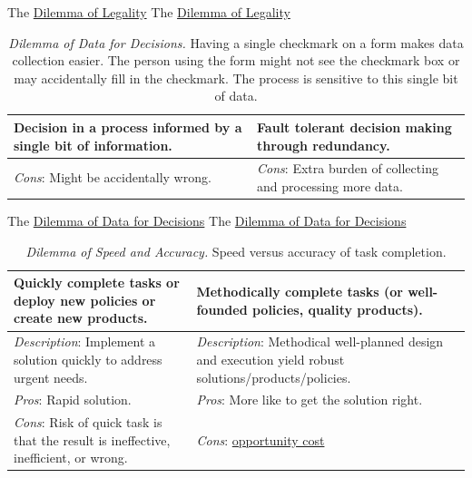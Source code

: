 The \href{table:legality}{Dilemma of Legality}
The \href{table:legality}{Dilemma of Legality}


\begin{center}
\begin{table}[H] %
\begin{tabular}{ | m{\dilemmatablewidth}| m{\dilemmatablewidth} | } 
  \hline
  \textbf{Decision in a process informed by a single bit of information.} & 
  \textbf{Fault tolerant decision making through redundancy.} \\ 
  \hline
  \textit{Cons}: Might be accidentally wrong. &
  \textit{Cons}: Extra burden of collecting and processing more data. \\  
  \hline
\end{tabular}
\caption{
\textit{Dilemma of Data for Decisions.}
Having a single checkmark on a form makes data collection easier. The person using the form might not see the checkmark box or may accidentally fill in the checkmark. The process is sensitive to this single bit of data.
}
\label{table:single-bit-decision}
\end{table}
\end{center}

The \href{table:single-bit-decision}{Dilemma of Data for Decisions}
The \href{table:single-bit-decision}{Dilemma of Data for Decisions}

\begin{center}
\begin{table}[H] %
\begin{tabular}{ | m{\dilemmatablewidth}| m{\dilemmatablewidth} | } 
  \hline
  \textbf{Quickly complete tasks or deploy new policies or create new products.} & 
  \textbf{Methodically complete tasks (or well-founded policies, quality products).} \\ 
  \hline
  \textit{Description}: Implement a solution quickly to address urgent needs. &
  \textit{Description}: Methodical well-planned design and execution yield robust solutions/products/policies. \\
  \hline
  \textit{Pros}: Rapid solution. &
  \textit{Pros}: More like to get the solution right. \\
  \hline
  \textit{Cons}: Risk of quick task is that the result is ineffective, inefficient, or wrong. &
  \textit{Cons}: \href{https://en.wikipedia.org/wiki/Opportunity_cost}{opportunity cost} \\  
  \hline
\end{tabular}
\caption{
\textit{Dilemma of Speed and Accuracy.}
Speed versus accuracy of task completion.
}
\label{table:quick-methodical}
\end{table}
\end{center}

